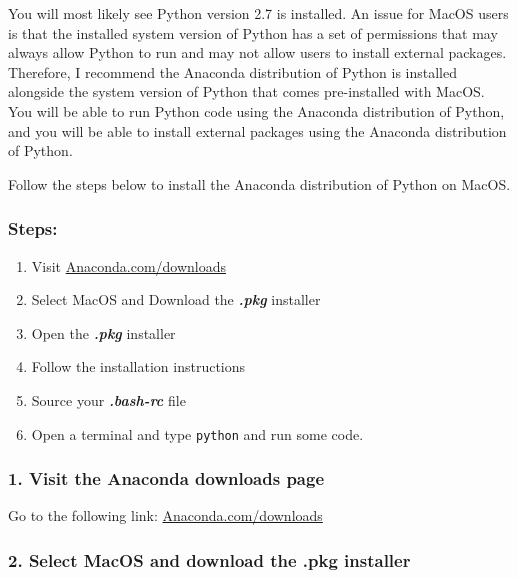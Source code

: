 \documentclass{book}
\newcommand{\passthrough}[1]{#1}
\begin{document}
You will most likely see Python version 2.7 is installed. An issue for
MacOS users is that the installed system version of Python has a set of
permissions that may always allow Python to run and may not allow users
to install external packages. Therefore, I recommend the Anaconda
distribution of Python is installed alongside the system version of
Python that comes pre-installed with MacOS. You will be able to run
Python code using the Anaconda distribution of Python, and you will be
able to install external packages using the Anaconda distribution of
Python.

Follow the steps below to install the Anaconda distribution of Python on
MacOS.

\hypertarget{steps}{%
\subsubsection{Steps:}\label{steps}}

\begin{enumerate}
\def\labelenumi{\arabic{enumi}.}
\item
  Visit
  \href{https://www.anaconda.com/download/}{Anaconda.com/downloads}
\item
  Select MacOS and Download the \textbf{\emph{.pkg}} installer
\item
  Open the \textbf{\emph{.pkg}} installer
\item
  Follow the installation instructions
\item
  Source your \textbf{\emph{.bash-rc}} file
\item
  Open a terminal and type \passthrough{\lstinline!python!} and run some
  code.
\end{enumerate}
    




    
        \hypertarget{visit-the-anaconda-downloads-page}{%
\subsubsection{1. Visit the Anaconda downloads
page}\label{visit-the-anaconda-downloads-page}}

Go to the following link:
\href{https://www.anaconda.com/download/}{Anaconda.com/downloads}
    




    
        \hypertarget{select-macos-and-download-the-.pkg-installer}{%
\subsubsection{2. Select MacOS and download the .pkg
installer}\label{select-macos-and-download-the-.pkg-installer}}
\end{document}
